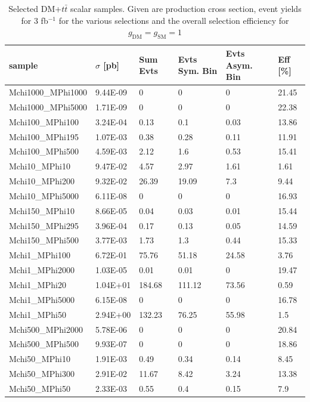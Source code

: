 \begin{table}[h!]
\small
\centering
\begin{tabular}{l|lllll}
\hline
sample             & $\sigma$ [pb] & Sum Evts       & Evts Sym. Bin & Evts Asym. Bin & Eff  [\%]   \\\hline
Mchi1000\_MPhi1000 & 9.44E-09 & 0      & 0      & 0     & 21.45 \\
Mchi1000\_MPhi5000 & 1.71E-09 & 0      & 0      & 0     & 22.38 \\
Mchi100\_MPhi100   & 3.24E-04 & 0.13   & 0.1    & 0.03  & 13.86 \\
Mchi100\_MPhi195   & 1.07E-03 & 0.38   & 0.28   & 0.11  & 11.91 \\
Mchi100\_MPhi500   & 4.59E-03 & 2.12   & 1.6    & 0.53  & 15.41 \\
Mchi10\_MPhi10     & 9.47E-02 & 4.57   & 2.97   & 1.61  & 1.61  \\
Mchi10\_MPhi200    & 9.32E-02 & 26.39  & 19.09  & 7.3   & 9.44  \\
Mchi10\_MPhi5000   & 6.11E-08 & 0      & 0      & 0     & 16.93 \\
Mchi150\_MPhi10    & 8.66E-05 & 0.04   & 0.03   & 0.01  & 15.44 \\
Mchi150\_MPhi295   & 3.96E-04 & 0.17   & 0.13   & 0.05  & 14.59 \\
Mchi150\_MPhi500   & 3.77E-03 & 1.73   & 1.3    & 0.44  & 15.33 \\
Mchi1\_MPhi100     & 6.72E-01 & 75.76  & 51.18  & 24.58 & 3.76  \\
Mchi1\_MPhi2000    & 1.03E-05 & 0.01   & 0.01   & 0     & 19.47 \\
Mchi1\_MPhi20      & 1.04E+01 & 184.68 & 111.12 & 73.56 & 0.59  \\
Mchi1\_MPhi5000    & 6.15E-08 & 0      & 0      & 0     & 16.78 \\
Mchi1\_MPhi50      & 2.94E+00 & 132.23 & 76.25  & 55.98 & 1.5   \\
Mchi500\_MPhi2000  & 5.78E-06 & 0      & 0      & 0     & 20.84 \\
Mchi500\_MPhi500   & 9.93E-07 & 0      & 0      & 0     & 18.86 \\
Mchi50\_MPhi10     & 1.91E-03 & 0.49   & 0.34   & 0.14  & 8.45  \\
Mchi50\_MPhi300    & 2.91E-02 & 11.67  & 8.42   & 3.24  & 13.38 \\
Mchi50\_MPhi50     & 2.33E-03 & 0.55   & 0.4    & 0.15  & 7.9  \\
\hline
\end{tabular}
\caption{Selected DM+$t\bar{t}$ scalar samples. Given are production cross section, event yields for 3 fb$^{-1 }$ for the various selections and the overall selection efficiency for $g_\textrm{DM}=g_\textrm{SM}=1$ \label{tab:dmtt_S}}
\end{table}

